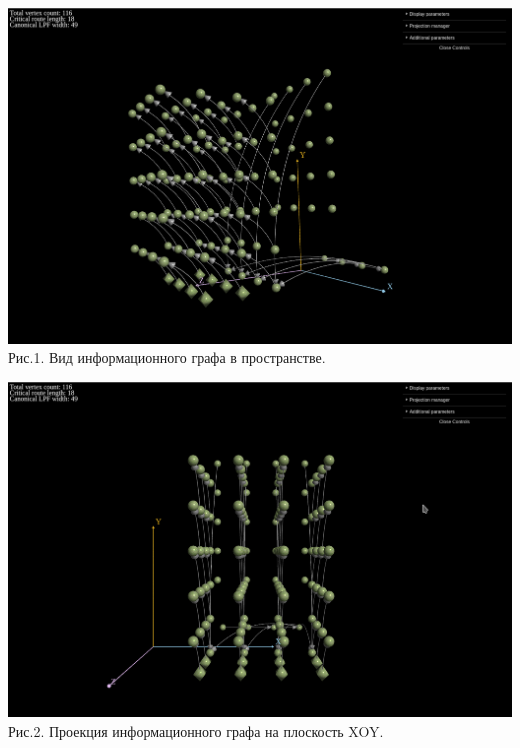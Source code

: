 \documentclass[a4paper, 12pt]{article}
\begin{document}
	\begin{center}
		\includegraphics[scale=0.5]{src/graph_3d.png}\\
		Рис.1. Вид информационного графа в пространстве.
	\end{center}
	
	\begin{center}
		\includegraphics[scale=0.5]{src/graph_xy.png}\\
		Рис.2. Проекция информационного графа на плоскость XOY.
	\end{center}
	
\end{document}
